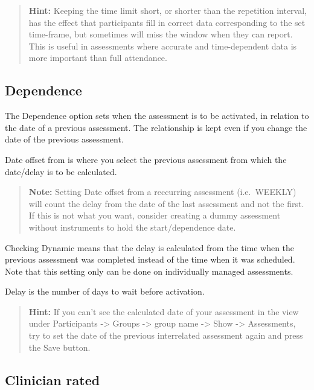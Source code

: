 \documentclass[
]{book}
\begin{document}
\begin{quote}
\textbf{Hint:} Keeping the time limit short, or shorter than the repetition interval, has the effect that participants fill in correct data corresponding to the set time-frame, but sometimes will miss the window when they can report. This is useful in assessments where accurate and time-dependent data is more important than full attendance.
\end{quote}

\subsection{Dependence}\label{dependence}

The Dependence option sets when the assessment is to be activated, in relation to the date of a previous assessment. The relationship is kept even if you change the date of the previous assessment.

Date offset from is where you select the previous assessment from which the date/delay is to be calculated.

\begin{quote}
\textbf{Note:} Setting Date offset from a reccurring assessment (i.e.~WEEKLY) will count the delay from the date of the last assessment and not the first. If this is not what you want, consider creating a dummy assessment without instruments to hold the start/dependence date.
\end{quote}

Checking Dynamic means that the delay is calculated from the time when the previous assessment was completed instead of the time when it was scheduled. Note that this setting only can be done on individually managed assessments.

Delay is the number of days to wait before activation.

\begin{quote}
\textbf{Hint:} If you can't see the calculated date of your assessment in the view under Participants -\textgreater{} Groups -\textgreater{} group name -\textgreater{} Show -\textgreater{} Assessments, try to set the date of the previous interrelated assessment again and press the Save button.
\end{quote}

\subsection{Clinician rated}\label{clinician-rated}
\end{document}

